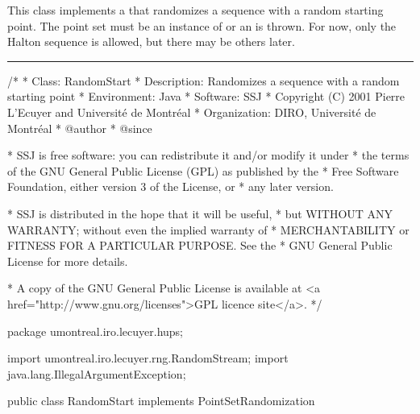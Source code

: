 
This class implements a
that randomizes a sequence with a random starting point.
The point set must be an instance of 
 or an
 is thrown.
For now, only the Halton sequence is allowed, but there may be others
later.

\bigskip\hrule\bigskip

\begin{code}
\begin{hide}
/*
 * Class:        RandomStart
 * Description:  Randomizes a sequence with a random starting point
 * Environment:  Java
 * Software:     SSJ 
 * Copyright (C) 2001  Pierre L'Ecuyer and Université de Montréal
 * Organization: DIRO, Université de Montréal
 * @author       
 * @since

 * SSJ is free software: you can redistribute it and/or modify it under
 * the terms of the GNU General Public License (GPL) as published by the
 * Free Software Foundation, either version 3 of the License, or
 * any later version.

 * SSJ is distributed in the hope that it will be useful,
 * but WITHOUT ANY WARRANTY; without even the implied warranty of
 * MERCHANTABILITY or FITNESS FOR A PARTICULAR PURPOSE.  See the
 * GNU General Public License for more details.

 * A copy of the GNU General Public License is available at
   <a href="http://www.gnu.org/licenses">GPL licence site</a>.
 */
\end{hide}
package umontreal.iro.lecuyer.hups;
\begin{hide}
 import umontreal.iro.lecuyer.rng.RandomStream;
 import java.lang.IllegalArgumentException;
\end{hide}

public class RandomStart implements PointSetRandomization \begin{hide} {

   protected RandomStream stream;
\end{hide}
\end{code}

